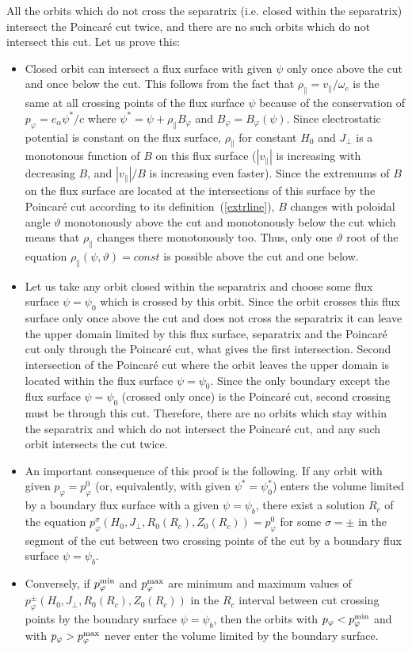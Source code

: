 \documentclass[preprint,prb,aps]{revtex4-1}
\newcommand{\eq}[1]{(\ref{#1})}
\begin{document}
\noindent
All the orbits which do not cross the separatrix (i.e. closed within the separatrix)
intersect the Poincar\'e cut twice, and there are no such orbits which do not
intersect this cut. Let us prove this:
\begin{itemize}
\item
Closed orbit can intersect a flux surface with given $\psi$ only once above the cut and
once below the cut. This follows from the fact that $\rho_\parallel=v_\parallel/\omega_c$
is the same at all crossing points of the flux surface $\psi$ because of the conservation
of $p_\varphi=e_\alpha \psi^\ast /c$ where $\psi^\ast=\psi+\rho_\parallel B_\varphi$
and $B_\varphi=B_\varphi(\psi)$. Since electrostatic potential is constant on the
flux surface, $\rho_\parallel$ for constant $H_0$ and $J_\perp$ is a monotonous function of 
$B$ on this flux surface ($|v_\parallel|$ is increasing with decreasing $B$, 
and $|v_\parallel|/B$ is increasing even faster). Since the extremums of $B$ on
the flux surface are located at the intersections of this surface by the Poincar\'e 
cut according to its definition~\eq{extrline}, 
$B$ changes with poloidal angle $\vartheta$ monotonously above 
the cut and monotonously below the cut which means that $\rho_\parallel$ changes 
there monotonously too. Thus, only one $\vartheta$ root of the equation
$\rho_\parallel(\psi,\vartheta)=const$ is possible above the cut
and one below.
\item
Let us take any orbit closed within the separatrix and choose some flux surface 
$\psi=\psi_0$ which is crossed by this orbit. 
Since the orbit crosses this flux surface
only once above the cut and does not cross the separatrix it can leave the upper
domain limited by this flux surface, separatrix and the Poincar\'e cut only through
the Poincar\'e cut, what gives the first intersection. Second intersection of the
Poincar\'e cut where the orbit leaves the upper domain is located within the 
flux surface $\psi=\psi_0$. Since the only boundary
except the flux surface $\psi=\psi_0$
(crossed only once) is the Poincar\'e cut, second crossing
must be through this cut. Therefore, there are no orbits which stay within the 
separatrix and which do not intersect the Poincar\'e cut, and any such orbit 
intersects the cut twice.
\item
An important consequence of this proof is the following. If any orbit with given
$p_\varphi=p_\varphi^0$ (or, equivalently, with given $\psi^\ast=\psi^\ast_0$) 
enters the volume limited by a boundary flux surface with a given $\psi=\psi_b$, 
there exist a solution $R_c$ of the equation 
$p_\varphi^\sigma(H_0,J_\perp,R_0(R_c),Z_0(R_c))=p_\varphi^0$ for some 
$\sigma=\pm$ in the segment of the cut between two crossing points of the cut 
by a boundary flux surface $\psi=\psi_b$.
\item
Conversely, if $p_\varphi^{\rm min}$ and $p_\varphi^{\rm max}$ are minimum and
maximum values of $p_\varphi^\pm(H_0,J_\perp,R_0(R_c),Z_0(R_c))$ 
in the $R_c$ interval between cut
crossing points by the boundary surface $\psi=\psi_b$, then the orbits
with $p_\varphi<p_\varphi^{\rm min}$ and with $p_\varphi>p_\varphi^{\rm max}$
never enter the volume limited by the boundary surface.
\end{itemize}
\end{document}
